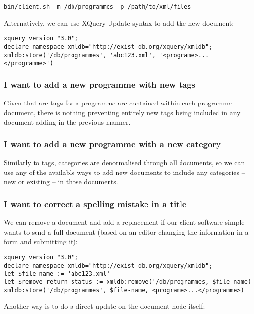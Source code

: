\documentclass[11pt,a4paper]{article}
\begin{document}
\begin{lstlisting}
bin/client.sh -m /db/programmes -p /path/to/xml/files
\end{lstlisting}

Alternatively, we can use XQuery Update syntax to add the new document:

\begin{lstlisting}
xquery version "3.0";
declare namespace xmldb="http://exist-db.org/xquery/xmldb";
xmldb:store('/db/programmes', 'abc123.xml', '<programe>...</programme>')
\end{lstlisting}

\subsubsection{I want to add a new programme with new tags}

Given that are tags for a programme are contained within each programme
document, there is nothing preventing entirely new tags being included
in any document adding in the previous manner.

\subsubsection{I want to add a new programme with a new category}

Similarly to tags, categories are denormalised through all documents, so
we can use any of the available ways to add new documents to include
any categories -- new or existing -- in those documents.

\subsubsection{I want to correct a spelling mistake in a title}

We can remove a document and add a replacement if our client
software simple wants to send a full document (based on an editor
changing the information in a form and submitting it):

\begin{lstlisting}
xquery version "3.0";
declare namespace xmldb="http://exist-db.org/xquery/xmldb";
let $file-name := 'abc123.xml'
let $remove-return-status := xmldb:remove('/db/programmes, $file-name)
xmldb:store('/db/programmes', $file-name, <programe>...</programme>)
\end{lstlisting}

Another way is to do a direct update on the document node itself:
\end{document}
